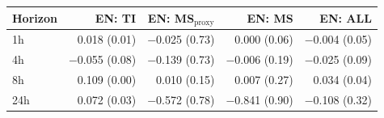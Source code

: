 \begin{tabular}{lrrrr}
\toprule
Horizon & EN: TI & EN: MS$_{\text{proxy}}$ & EN: MS & EN: ALL\\
\midrule
1h & 0.018 (0.01) & \ensuremath{-}0.025 (0.73) & 0.000 (0.06) & \ensuremath{-}0.004 (0.05)\\
4h & \ensuremath{-}0.055 (0.08) & \ensuremath{-}0.139 (0.73) & \ensuremath{-}0.006 (0.19) & \ensuremath{-}0.025 (0.09)\\
8h & 0.109 (0.00) & 0.010 (0.15) & 0.007 (0.27) & 0.034 (0.04)\\
24h & 0.072 (0.03) & \ensuremath{-}0.572 (0.78) & \ensuremath{-}0.841 (0.90) & \ensuremath{-}0.108 (0.32)\\
\bottomrule
\end{tabular}
